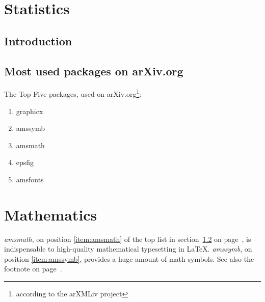 \documentclass{book}
\begin{document}
\chapter{Statistics}
\section{Introduction}
\newpage
\section{Most used packages on arXiv.org}\label{sec:packages}
The Top Five packages, used on arXiv.org\footnote{according
to the arXMLiv project\label{fn:project}}:
\begin{enumerate}
  \item graphicx
  \item amssymb \label{item:amssymb}
  \item amsmath \label{item:amsmath}
  \item epsfig
  \item amsfonts
\end{enumerate}
\chapter{Mathematics}
\emph{amsmath}, on position \ref{item:amsmath} of the top list
in section~\ref{sec:packages} on page~\pageref{sec:packages},
is indispensable to high-quality mathematical typesetting in \LaTeX.
\emph{amssymb}, on position \ref{item:amssymb},
provides a huge amount of math symbols.
See also the footnote on page~\pageref{fn:project}.
\end{document}
